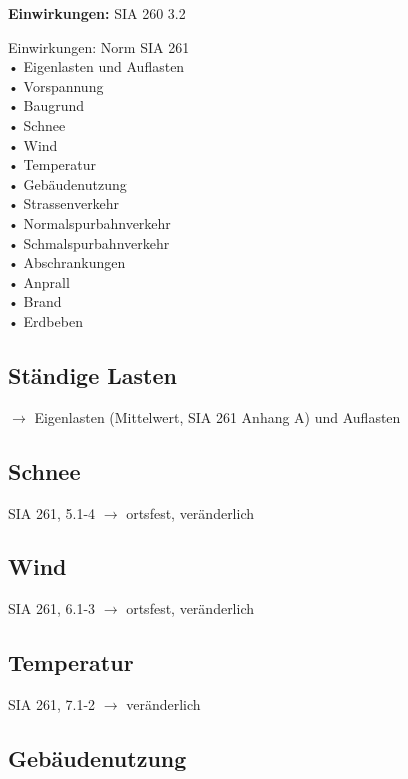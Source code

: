 \begin{multicols}{2}
			\textbf{Einwirkungen:} SIA 260 3.2 
			
			Einwirkungen: Norm SIA 261\\
			• Eigenlasten und Auflasten \\
			• Vorspannung \\
			• Baugrund \\
			• Schnee \\
			• Wind \\
			• Temperatur \\
			• Gebäudenutzung \\
			• Strassenverkehr \\
			• Normalspurbahnverkehr \\
			• Schmalspurbahnverkehr \\
			• Abschrankungen \\
			• Anprall \\
			• Brand \\
			• Erdbeben
			
			
			
			\subsection{Ständige Lasten}
			
			$\rightarrow$ Eigenlasten (Mittelwert, SIA 261 Anhang A) und Auflasten
			
			
			\subsection{Schnee}
			
			SIA 261, 5.1-4 $\rightarrow$ ortsfest, veränderlich
			
			
			\subsection{Wind}
			
			SIA 261, 6.1-3 $\rightarrow$ ortsfest, veränderlich
			
			
			\subsection{Temperatur}
			
			SIA 261, 7.1-2 $\rightarrow$ veränderlich
			
			\subsection{Gebäudenutzung}
			

\end{multicols}
